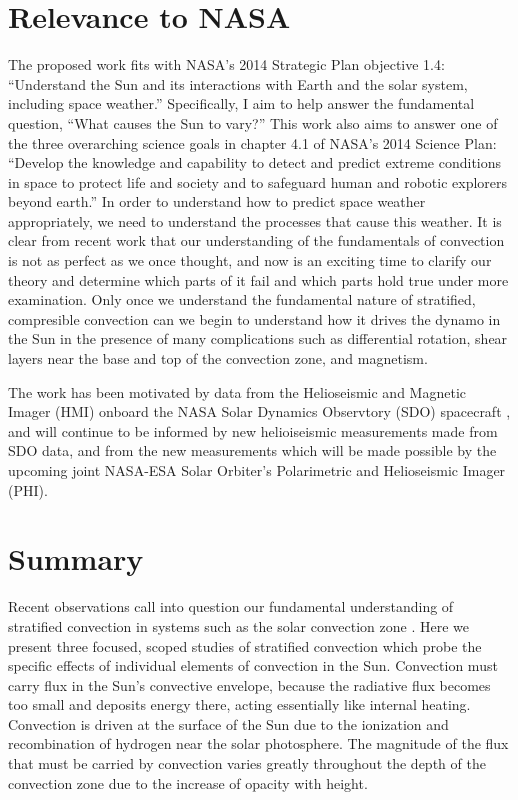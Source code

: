 \documentclass[aasms,12pt]{article}
\begin{document}
\section{Relevance to NASA} 
The proposed work fits with NASA's 2014 Strategic Plan objective
1.4:
``Understand the Sun and its interactions with Earth and the solar
system, including space weather.''  Specifically, I aim to help answer
the fundamental question, ``What causes the Sun to vary?'' 
This work also aims to answer one of the three overarching science goals
in chapter 4.1 of NASA's 2014 Science Plan: 
``Develop the
knowledge and capability to detect and predict extreme conditions in space to
protect life and society and to safeguard human and robotic explorers beyond
earth.'' In order to understand how to predict space weather appropriately, we
need to understand the processes that cause this weather.  It is clear from
recent work that our understanding of the fundamentals of convection is not as perfect
as we once thought, and now is an exciting time to clarify our theory and determine which
parts of it fail and which parts hold true under more examination.  Only once we understand
the fundamental nature of stratified, compresible convection can we begin to understand
how it drives the dynamo in the Sun in the presence of many complications such as
differential rotation, shear layers near the base and top of the convection zone, and
magnetism.

The work has been motivated by data from the Helioseismic and Magnetic Imager (HMI) onboard
the NASA Solar Dynamics Observtory (SDO) spacecraft 
\cite{hanasoge&all2012, greer&all2015, hathaway&all2015}, and will continue to be informed by
new helioiseismic measurements made from SDO data, and from the new measurements which will
be made possible by the upcoming joint NASA-ESA Solar Orbiter's Polarimetric and 
Helioseismic Imager (PHI).


\section{Summary}
Recent observations call into question our fundamental understanding of stratified
convection in systems such as the solar convection zone \cite{hanasoge&all2012, greer&all2015}.
Here we present three focused, scoped studies of stratified convection which probe the
specific effects of individual elements of convection in the Sun.  Convection must carry
flux in the Sun's convective envelope, because the radiative flux becomes too small and deposits
energy there, acting essentially like internal heating. Convection is driven at the surface of
the Sun due to the ionization and recombination of hydrogen near the solar photosphere.  The
magnitude of the flux that must be carried by convection varies greatly throughout the depth
of the convection zone due to the increase of opacity with height.
\end{document}
